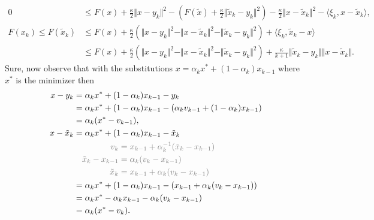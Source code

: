 \documentclass[12pt]{article}
\begin{document}
        {\small
        \begin{align*}
            0 &\le
            F(x) + \frac{\kappa}{2}\Vert x - y_k\Vert^2 
            - \left(
                F(\tilde x) 
                + \frac{\kappa}{2}\Vert \tilde x_k - y_k\Vert^2
            \right)
            - \frac{\kappa}{2}\Vert x - \tilde x_k\Vert^2 
            - \langle \xi_k, x - \tilde x_k\rangle
            , 
            \\
            F(x_k)
            \le F(\tilde x_k) 
            &\le 
            F(x) + \frac{\kappa}{2}\left(
                \Vert x - y_k\Vert^2 - \Vert x - \tilde x_k\Vert^2 - \Vert \tilde x_k - y_k\Vert^2
            \right)
            + \langle  \xi_k, \tilde x_k - x \rangle 
            \\
            &\le 
            F(x) + \frac{\kappa}{2}\left(
                \Vert x - y_k\Vert^2 - \Vert x - \tilde x_k\Vert^2 - \Vert \tilde x_k - y_k\Vert^2
            \right)
            + \frac{\kappa}{k + 1}\Vert \tilde x_k - y_k\Vert\Vert x - \tilde x_k\Vert. 
        \end{align*}
        }
        Sure, now observe that with the substitutions $x = \alpha_k x^* + (1 - \alpha_k) x_{k-1}$ where $x^*$ is the minimizer then
        \begin{align*}
            x - y_k
            &= 
            \alpha_k x^* + (1 - \alpha_k) x_{k - 1} - y_k 
            \\
            &= \alpha_k x^* + (1 - \alpha_k) x_{k - 1} - (\alpha_k v_{k - 1} + (1 - \alpha_k)x_{k - 1})
            \\
            &= \alpha_k (x^* - v_{k - 1}), 
            \\
            x - \tilde x_k 
            &= 
            \alpha_k x^* + (1 - \alpha_k) x_{k - 1} - \tilde x_k
            \\
            &\quad 
            \textcolor{gray}{
            \begin{aligned}
                v_{k} &= x_{k - 1} + \alpha_k^{-1}(\tilde x_k - x_{k - 1})
                \\
                \tilde x_k - x_{k - 1} &= \alpha_k(v_k - x_{k - 1})
                \\
                \tilde x_k &= x_{k - 1} + \alpha_k(v_k - x_{k - 1})
            \end{aligned}
            }
            \\
            &= 
            \alpha_k x^* + (1 - \alpha_k) x_{k - 1} - (x_{k - 1} + \alpha_k(v_k - x_{k - 1}))
            \\
            &= \alpha_k x^* - \alpha_k x_{k - 1} - \alpha_k(v_k - x_{k - 1})
            \\
            &= \alpha_k (x^* - v_k). 
        \end{align*}
\end{document}
